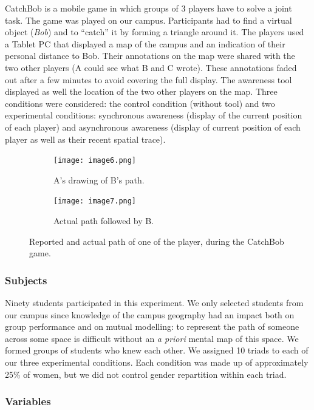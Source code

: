 \documentclass[natbib]{svjour3}
\newcommand{\A}{A\xspace}
\newcommand{\B}{B\xspace}
\newcommand{\C}{C\xspace}
\begin{document}
{\sc CatchBob} is a mobile game in which groups of 3 players have to solve a
joint task. The game was played on our campus. Participants had to find a
virtual object (\emph{Bob}) and to ``catch'' it by forming a triangle around it.
The players used a Tablet PC that displayed a map of the campus and an indication of
their personal distance to Bob. Their annotations on the map were shared with
the two other players (\A could see what \B and \C wrote). These annotations
faded out after a few minutes to avoid covering the full display. The awareness
tool displayed as well the location of the two other players on the map. Three
conditions were considered: the control condition (without tool) and two
experimental conditions: synchronous awareness (display of the current position
of each player) and asynchronous awareness (display of current position of each
player as well as their recent spatial trace).

\begin{figure}[h!t] \centering \begin{subfigure}{.45\textwidth}
\texttt{[image: image6.png]} \caption{A's drawing of \B's
path.} \end{subfigure} \begin{subfigure}{.4\textwidth}
\texttt{[image: image7.png]} \caption{Actual path followed by
\B.} \end{subfigure} \caption{Reported and actual path of one of the player,
during the {\sc CatchBob} game.} \label{study2:paths} \end{figure}

\subsubsection*{Subjects}


Ninety students participated in this experiment. We only selected students from
our campus since knowledge of the campus geography had an impact both on group
performance and on mutual modelling: to represent the path of someone across
some space is difficult without an \textit{a priori} mental map of this space.
We formed groups of students who knew each other. We assigned 10 triads to each
of our three experimental conditions. Each condition was made up of
approximately 25\% of women, but we did not control gender repartition within
each triad.

\subsubsection*{Variables}
\end{document}
